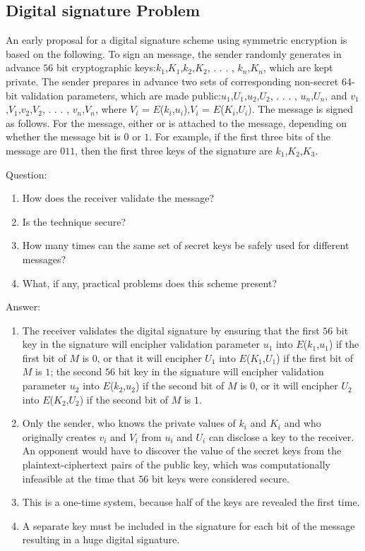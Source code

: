 \documentclass[paper=a4, fontsize=11pt]{scrartcl} %
\numberwithin{equation}{section} %
\numberwithin{figure}{section} %
\numberwithin{table}{section} %
\begin{document}
\subsection{Digital signature Problem \uppercase\expandafter{}}

An early proposal for a digital signature scheme using symmetric encryption is based on the following. To sign an message, the sender randomly generates in advance $56$ bit cryptographic keys:$k$$_1$,$K$$_1$,$k$$_2$,$K$$_2$, . . . , $k$$_n$,$K$$_n$, which are kept private. The sender prepares in advance two sets of corresponding non-secret 64-bit validation parameters, which are made public:$u$$_1$,$U$$_1$,$u$$_2$,$U$$_2$, . . . , $u$$_n$,$U$$_n$, and $v$$_1$,$V$$_1$,$v$$_2$,$V$$_2$, . . . , $v$$_n$,$V$$_n$, where $V$$_i$ = $E$($k$$_i$,$u$$_i$),$V$$_i$ = $E$($K$$_i$,$U$$_i$). The message is signed as follows. For the message, either or is attached to the message, depending on whether the message bit is $0$ or $1$. For example, if the first three bits of the message are $011$, then the first three keys of the signature are $k$$_1$,$K$$_2$,$K$$_3$.

Question:
\begin{enumerate}
\item How does the receiver validate the message?
\item Is the technique secure?
\item How many times can the same set of secret keys be safely used for different messages?
\item What, if any, practical problems does this scheme present?
\end{enumerate}

Answer:
\begin{enumerate}
\item The receiver validates the digital signature by ensuring that the first $56$ bit key in the signature will encipher validation parameter $u$$_1$ into $E$($k$$_1$,$u$$_1$) if the first bit of $M$ is $0$, or that it will encipher $U$$_1$ into $E$($K$$_1$,$U$$_1$) if the first bit of $M$ is $1$; the second $56$ bit key in the signature will encipher validation parameter $u$$_2$ into $E$($k$$_2$,$u$$_2$) if the second bit of $M$ is $0$, or it will encipher $U$$_2$ into $E$($K$$_2$,$U$$_2$) if the second bit of $M$ is $1$.
\item Only the sender, who knows the private values of $k$$_i$ and $K$$_i$ and who originally creates $v$$_i$ and $V$$_i$ from $u$$_i$ and $U$$_i$ can disclose a key to the receiver. An opponent would have to discover the value of the secret keys from the plaintext-ciphertext pairs of the public key, which was computationally infeasible at the time that $56$ bit keys were considered secure.
\item This is a one-time system, because half of the keys are revealed the first time.
\item A separate key must be included in the signature for each bit of the message resulting in a huge digital signature.
\end{enumerate}
\end{document}
